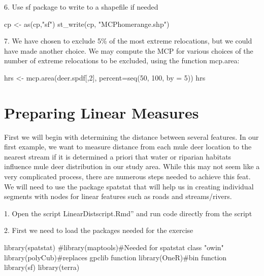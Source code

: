 \documentclass[
  letterpaper,
]{book}
\newenvironment{Shaded}{\begin{snugshade}}{\end{snugshade}}
\newcommand{\AttributeTok}[1]{\textcolor[rgb]{0.40,0.45,0.13}{#1}}
\newcommand{\CommentTok}[1]{\textcolor[rgb]{0.37,0.37,0.37}{#1}}
\newcommand{\DecValTok}[1]{\textcolor[rgb]{0.68,0.00,0.00}{#1}}
\newcommand{\FunctionTok}[1]{\textcolor[rgb]{0.28,0.35,0.67}{#1}}
\newcommand{\NormalTok}[1]{\textcolor[rgb]{0.00,0.23,0.31}{#1}}
\newcommand{\OtherTok}[1]{\textcolor[rgb]{0.00,0.23,0.31}{#1}}
\newcommand{\StringTok}[1]{\textcolor[rgb]{0.13,0.47,0.30}{#1}}
\begin{document}
6. Use sf package to write to a shapefile if needed

\begin{Shaded}
\begin{Highlighting}[]
\NormalTok{cp }\OtherTok{\textless{}{-}} \FunctionTok{as}\NormalTok{(cp,}\StringTok{"sf"}\NormalTok{)}
\FunctionTok{st\_write}\NormalTok{(cp, }\StringTok{"MCPhomerange.shp"}\NormalTok{)}
\end{Highlighting}
\end{Shaded}

7. We have chosen to exclude 5\% of the most extreme relocations, but we
could have made another choice. We may compute the MCP for various
choices of the number of extreme relocations to be excluded, using the
function mcp.area:

\begin{Shaded}
\begin{Highlighting}[]
\NormalTok{hrs }\OtherTok{\textless{}{-}} \FunctionTok{mcp.area}\NormalTok{(deer.spdf[,}\DecValTok{2}\NormalTok{], }\AttributeTok{percent=}\FunctionTok{seq}\NormalTok{(}\DecValTok{50}\NormalTok{, }\DecValTok{100}\NormalTok{, }\AttributeTok{by =} \DecValTok{5}\NormalTok{))}
\NormalTok{hrs}
\end{Highlighting}
\end{Shaded}

\hypertarget{preparing-linear-measures}{%
\chapter{Preparing Linear Measures}\label{preparing-linear-measures}}

First we will begin with determining the distance between several
features. In our first example, we want to measure distance from each
mule deer location to the nearest stream if it is determined a priori
that water or riparian habitats influence mule deer distribution in our
study area. While this may not seem like a very complicated process,
there are numerous steps needed to achieve this feat. We will need to
use the package spatstat that will help us in creating individual
segments with nodes for linear features such as roads and
streams/rivers.

1. Open the script LinearDistscript.Rmd'' and run code directly from the
script

2. First we need to load the packages needed for the exercise

\begin{Shaded}
\begin{Highlighting}[]
\FunctionTok{library}\NormalTok{(spatstat)}
\CommentTok{\#library(maptools)\#Needed for spatstat class "owin"}
\FunctionTok{library}\NormalTok{(polyCub)}\CommentTok{\#replaces gpclib function}
\FunctionTok{library}\NormalTok{(OneR)}\CommentTok{\#bin function}
\FunctionTok{library}\NormalTok{(sf)}
\FunctionTok{library}\NormalTok{(terra)}
\end{Highlighting}
\end{Shaded}
\end{document}
